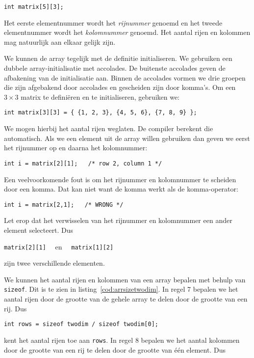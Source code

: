 \hspace*{1em}\texttt{int matrix[5][3];}

Het eerste elementnummer wordt het \textsl{rijnummer} genoemd en het tweede elementnummer wordt het \textsl{kolomnummer} genoemd. Het aantal rijen en kolommen mag natuurlijk aan elkaar gelijk zijn.

We kunnen de array tegelijk met de definitie initialiseren. We gebruiken een dubbele array-initialisatie met accolades. De buitenste accolades geven de afbakening van de initialisatie aan. Binnen de accolades vormen we drie groepen die zijn afgebakend door accolades en gescheiden zijn door komma's. Om een $3\times3$ matrix te definiëren en te initialiseren, gebruiken we:

\hspace*{1em}\texttt{int matrix[3][3] = \{ \{1, 2, 3\}, \{4, 5, 6\}, \{7, 8, 9\} \};}

We mogen hierbij het aantal rijen weglaten. De compiler berekent die automatisch. Als we een element uit de array willen gebruiken dan geven we eerst het rijnummer op en daarna het kolomnummer:

\hspace*{1em}\texttt{int i = matrix[2][1]; \ \ /* row 2, column 1 */}

Een veelvoorkomende fout is om het rijnummer en kolomnummer te scheiden door een komma. Dat kan niet want de komma werkt als de komma-operator:

\hspace*{1em}\texttt{int i = matrix[2,1]; \ \ /* WRONG */}

Let erop dat het verwisselen van het rijnummer en kolomnummer een ander element selecteert. Dus

\hspace*{1em}\texttt{matrix[2][1]} \ \ en \ \ \texttt{matrix[1][2]}

zijn twee verschillende elementen.

We kunnen het aantal rijen en kolommen van een array bepalen met behulp van \texttt{sizeof}. Dit is te zien in listing~\ref{cod:arrsizetwodim}.
In regel 7 bepalen we het aantal rijen door de grootte van de gehele array te delen door de grootte van een rij. Dus

\hspace*{1em}\texttt{int rows = sizeof twodim / sizeof twodim[0];}

kent het aantal rijen toe aan \texttt{rows}. In regel 8 bepalen we het aantal kolommen door de grootte van een rij te delen door de grootte van één element. Dus


